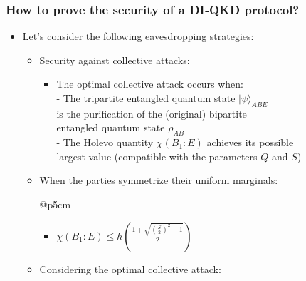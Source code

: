\documentclass{beamer}
\begin{document}
		\begin{frame}
			\frametitle{\large How to prove the security of a DI‑QKD protocol?}

            \vspace{4ex}
            \begin{itemize}
                \item Let's consider the following eavesdropping strategies:
                \begin{itemize}
                    \item Security against collective attacks:
                    \begin{itemize}
                        \item The optimal collective attack occurs when:\\
                        - The tripartite entangled quantum state ${|\psi\rangle}_{ABE}$\\\hspace{0.5em}is the purification of the (original) bipartite\\\hspace{0.5em}entangled quantum state ${\rho}_{AB}$\\
                        - The Holevo quantity $\chi({B}_{1}:E)$ achieves its possible\\\hspace{0.5em}largest value (compatible with the parameters $Q$ and $S$)
                    \end{itemize}
                    \vspace{1ex}
                    \item When the parties symmetrize their uniform marginals:
                    \begin{blockarray}{@{}p{5cm}}
                        \vspace{-\baselineskip}
                        \begin{itemize}
                            \item $\chi({B}_{1}:E) \leq h\left( \frac{1 + \sqrt{{(\frac{S}{2})}^{2} - 1}}{2} \right)$
                        \end{itemize}
                        \vspace*{-\baselineskip}
                        \vspace*{0.5ex}
                    \end{blockarray}
                    \vspace{-1ex}
                    \item Considering the optimal collective attack:

\end{itemize}
\end{itemize}
\end{frame}
\end{document}
